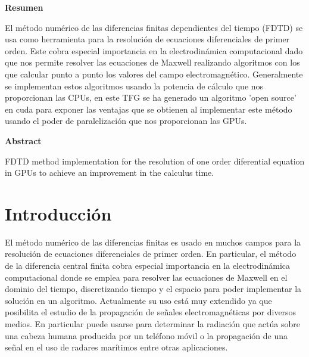 \documentclass[11pt,a4paper,twoside,pdf]{article}
\numberwithin{equation}{section}
\begin{document}
\begin{center}

{\bf Resumen}
\bigskip

\begin{minipage}{0.8\linewidth}
El método numérico de las diferencias finitas dependientes del tiempo (FDTD) se usa como herramienta para la resolución de ecuaciones diferenciales de primer orden.  Este cobra especial importancia en la electrodinámica computacional dado que nos permite resolver las ecuaciones de Maxwell realizando algoritmos con los que calcular punto a punto los valores del campo electromagnético. Generalmente se implementan estos algoritmos usando la potencia de cálculo que nos proporcionan las CPUs, en este TFG se ha generado un algoritmo 'open source' en cuda para exponer las ventajas que se obtienen al implementar este método usando el poder de paralelización que nos proporcionan las GPUs. 
\end{minipage}

\vfill

{\bf Abstract} 
\bigskip

\begin{minipage}{0.8\linewidth}
FDTD method implementation for the resolution of one order diferential equation in GPUs to achieve an improvement in the calculus time.
\end{minipage}

\vfill

\end{center}

\newpage

\tableofcontents

\newpage

\pagestyle{fancy}
\fancyhead[RO,LE]{\leftmark}
\fancyhead[LO,RE]{\thepage}
\fancyfoot{}

\section{Introducción}
El método numérico de las diferencias finitas es usado en muchos campos para la resolución de ecuaciones diferenciales de primer orden. En particular, el método de la diferencia central finita cobra especial importancia en la electrodinámica computacional donde se emplea para resolver las ecuaciones de Maxwell en el dominio del tiempo, discretizando tiempo y el espacio para poder implementar la solución en un algoritmo.
Actualmente su uso está muy extendido ya que posibilita el estudio de la propagación de señales electromagnéticas por diversos medios. En particular puede usarse para determinar la radiación que actúa sobre una cabeza humana producida por un teléfono móvil o la propagación de una señal en el uso de radares marítimos entre otras aplicaciones.
\end{document}
